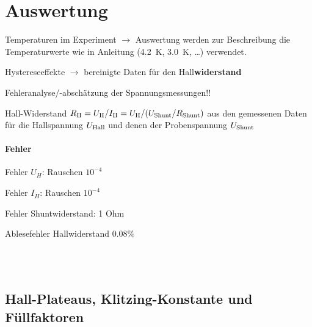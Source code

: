 \documentclass[paper=a4,fontsize=10pt,DIV=18,twocolumn,parskip=half]{scrartcl}
\numberwithin{equation}{section}    %
\begin{document}
%
\section{Auswertung}
\label{Auswertung}
%


\begin{compactitem}
	\item Temperaturen im Experiment $\rightarrow$ Auswertung werden zur Beschreibung die Temperaturwerte wie in Anleitung (\SI{4.2}{\kelvin}, \SI{3.0}{\kelvin}, \dots) verwendet.
	\item Hystereseeffekte $\rightarrow$ bereinigte Daten für den Hall\textbf{widerstand}
	\item Fehleranalyse/-abschätzung der Spannungsmessungen!!
\end{compactitem}

Hall-Widerstand $R_{\rm H}=U_{\rm H}/I_{\rm H} = U_{\rm H}/(U_{\rm Shunt}/R_{\rm Shunt})$ aus den gemessenen Daten für die Hallspannung $U_{\rm Hall}$ und denen der Probenspannung $U_{\rm Shunt}$

\paragraph*{Fehler}
\begin{compactitem}
	\item Fehler $U_{H}$: Rauschen $10^{-4}$
	\item Fehler $I_{H}$: Rauschen $10^{-4}$
	\item Fehler Shuntwiderstand: 1 Ohm
	\item Ablesefehler Hallwiderstand $0.08\%$
\end{compactitem}
% 
~~~~~~~~~~~~~~~~~~~~~~~~~~~~~~~~~~~~~~~~~~~~~~~~~~~~~~~~~~~~~~~~~~~~~~~~~~~~~
\subsection{Hall-Plateaus, Klitzing-Konstante und Füllfaktoren}
\label{a1}
\end{document}

